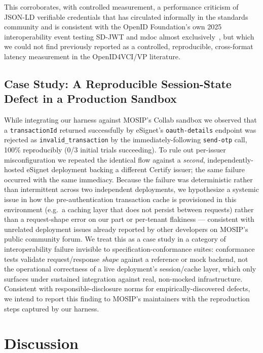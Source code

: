 \documentclass[conference]{IEEEtran}
\begin{document}
This corroborates, with controlled measurement, a performance criticism of JSON-LD verifiable credentials that has circulated informally in the standards community and is consistent with the OpenID Foundation's own 2025 interoperability event testing SD-JWT and mdoc almost exclusively~\cite{oidf-interop-nov2025}, but which we could not find previously reported as a controlled, reproducible, cross-format latency measurement in the OpenID4VCI/VP literature.

\subsection{Case Study: A Reproducible Session-State Defect in a Production Sandbox}
\label{sec:casestudy}

While integrating our harness against MOSIP's Collab sandbox we observed that a \texttt{transactionId} returned successfully by eSignet's \texttt{oauth-details} endpoint was rejected as \texttt{invalid\_transaction} by the immediately-following \texttt{send-otp} call, 100\% reproducibly (0/3 initial trials succeeding). To rule out per-issuer misconfiguration we repeated the identical flow against a \emph{second}, independently-hosted eSignet deployment backing a different Certify issuer; the same failure occurred with the same immediacy. Because the failure was deterministic rather than intermittent across two independent deployments, we hypothesize a systemic issue in how the pre-authentication transaction cache is provisioned in this environment (e.g.\ a caching layer that does not persist between requests) rather than a request-shape error on our part or per-tenant flakiness --- consistent with unrelated deployment issues already reported by other developers on MOSIP's public community forum. We treat this as a case study in a category of interoperability failure invisible to specification-conformance suites: conformance tests validate request/response \emph{shape} against a reference or mock backend, not the operational correctness of a live deployment's session/cache layer, which only surfaces under sustained integration against real, non-mocked infrastructure. Consistent with responsible-disclosure norms for empirically-discovered defects, we intend to report this finding to MOSIP's maintainers with the reproduction steps captured by our harness.

\section{Discussion}
\end{document}
